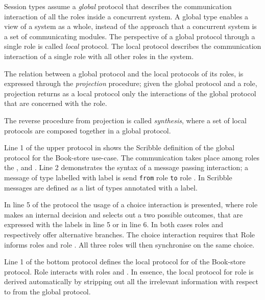 Session types assume a {\em global} protocol that describes the
communication interaction of all the roles inside a concurrent system.
A global type enables a view of a system as a whole, instead of the 
approach that a concurrent system is a set of communicating modules.
The perspective of a global protocol through a single role
is called {\em local} protocol. The local protocol describes
the communication interaction of a single role with all other roles
in the system.

The relation between a global protocol and the
local protocols of its roles, is expressed
through the {\em projection} procedure;
given the global protocol and a role, projection
returns as a local protocol only the
interactions of the global protocol that are concerned with
the role.

The reverse procedure from projection is called {\em synthesis},
where a set of local protocols are composed together in a global
protocol.




Line 1 of the upper protocol in  shows the
Scribble definition of the global protocol for the Book-store use-case.
The communication takes place
among roles the \BuyerOne, \BuyerTwo and \Seller. Line 2 demonstrates
the syntax of a message passing interaction; a message
of type  labelled with label  is send \lstinline|from|
role \BuyerOne \lstinline|to| role \Seller. In Scribble messages are
defined as a list of types annotated with a label.

In line 5 of the protocol 
the usage of a choice interaction is presented,
where role \BuyerTwo makes an internal decision and selects
out a two possible outcomes, that are
expressed with the labels  in line 5 or  in line 6.
In  both cases roles \BuyerOne and \Seller respectively offer
alternative branches. The choice interaction requires that
Role \BuyerTwo informs roles \BuyerOne and role \Seller. All
three roles will then synchronise on the same choice.


Line 1 of the bottom protocol defines the local protocol 
for \BuyerOne of the Book-store protocol. Role \BuyerOne
interacts with roles \BuyerTwo and \Seller. In essence,
the local protocol for role \BuyerOne is derived automatically
by stripping out all the irrelevant information with respect
to \BuyerOne from the global protocol.

